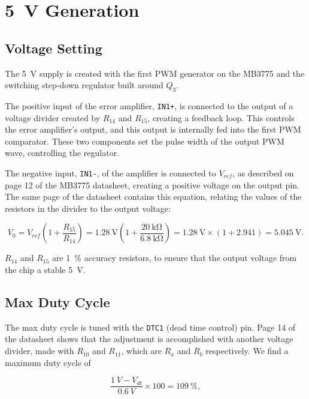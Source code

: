 \documentclass{article}
\newcommand{\Vref}{$V_{ref}$}
\newcommand{\chippin}{\texttt}
\newcommand{\model}{\textsf}
\begin{document}
\section{\qty{5}{\volt} Generation}
\label{sec:5v_generation}
\subsection{Voltage Setting}
The \qty{5}{\volt} supply is created with the first PWM generator on
the \model{MB3775} and the switching step-down regulator built around
$Q_3$.

The positive input of the error amplifier, \chippin{IN1+}, is
connected to the output of a voltage divider created by $R_{14}$ and
$R_{15}$, creating a feedback loop. This controls the error
amplifier's output, and this output is internally fed into the first
PWM comparator. These two components set the pulse width of the output
PWM wave, controlling the regulator.

The negative input, \chippin{IN1-}, of the amplifier is connected to
\Vref, as described on page 12 of the \model{MB3775} datasheet, creating a
positive voltage on the output pin. The same page of the datasheet
contains this equation, relating the values of the resistors in the
divider to the output voltage:

\begin{displaymath}
  V_0 = V_{ref}\left(1+\frac{R_{15}}{R_{14}}\right) =
  \qty{1.28}{\volt}\left(1+\frac{\qty{20}{\kilo\ohm}}{\qty{6.8}{\kilo\ohm}}\right)
  = \qty{1.28}{\volt}\times{}(1+2.941) = \qty{5.045}{\volt}.
\end{displaymath}

$R_{14}$ and $R_{15}$ are \qty{1}{\%} accuracy resistors, to ensure
that the output voltage from the chip a stable \qty{5}{\volt}.


\subsection{Max Duty Cycle}
The max duty cycle is tuned with the \chippin{DTC1} (dead time
control) pin. Page 14 of the datasheet shows that the adjustment is
accomplished with another voltage divider, made with $R_{10}$ and
$R_{11}$, which are $R_a$ and $R_b$ respectively. We find a maximum
duty cycle of

\begin{displaymath}
  \frac{\qty{1}{V} - V_{dt}}{\qty{0.6}{V}}
  \times{} 100 = \qty{109}{\%},
\end{displaymath}
\end{document}
